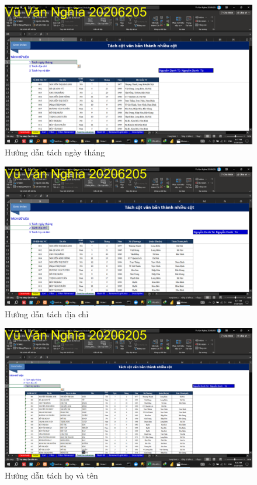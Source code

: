 \documentclass{article}
\begin{document}
\begin{figure}[h]
    \centering
    \includegraphics[scale = 0.15]{Video1/HuongDan/8.png}
    \caption{Hướng dẫn  tách ngày tháng}
\end{figure}
\begin{figure}[h]
    \centering
    \includegraphics[scale = 0.15]{Video1/HuongDan/9.png}
    \caption{Hướng dẫn  tách  địa chỉ}
\end{figure}
\begin{figure}[h]
    \centering
    \includegraphics[scale = 0.15]{Video1/HuongDan/10.png}
    \caption{Hướng dẫn  tách  họ và tên}
\end{figure}
\end{document}
